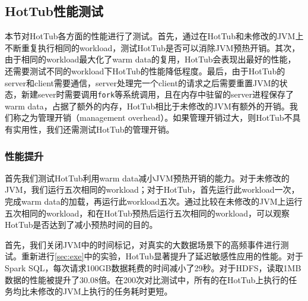 \documentclass[lang=cn,12pt,a4paper,cite=authoryear]{elegantpaper}
\begin{document}
\subsection{HotTub性能测试}
本节对HotTub各方面的性能进行了测试。首先，通过在HotTub和未修改的JVM上不断重复执行相同的workload，测试HotTub是否可以消除JVM预热开销。其次，由于相同的workload最大化了warm data的复用，HotTub会表现出最好的性能，还需要测试不同的workload下HotTub的性能降低程度。最后，由于HotTub的server和client需要通信，server处理完一个client的请求之后需要重置JVM的状态，新建sever时需要调用\texttt{fork}等系统调用，且在内存中驻留的server进程保存了warm data，占据了额外的内存，HotTub相比于未修改的JVM有额外的开销。我们称之为管理开销（management overhead）。如果管理开销过大，则HotTub不具有实用性，我们还需测试HotTub的管理开销。

\subsubsection{性能提升}
首先我们测试HotTub利用warm data减小JVM预热开销的能力。对于未修改的JVM，我们运行五次相同的workload；对于HotTub，首先运行此workload一次，完成warm data的加载，再运行此workload五次。通过比较在未修改的JVM上运行五次相同的workload，和在HotTub预热后运行五次相同的workload，可以观察HotTub是否达到了减小预热时间的目的。

首先，我们关闭JVM中的时间标记，对真实的大数据场景下的高频事件进行测试。重新进行\ref{sec:exe}中的实验，HotTub显著提升了延迟敏感性应用的性能。对于Spark SQL，每次请求100GB数据耗费的时间减小了29秒。对于HDFS，读取1MB数据的性能被提升了30.08倍。在200次对比测试中，所有的在HotTub上执行的任务均比未修改的JVM上执行的任务耗时更短。
\end{document}
